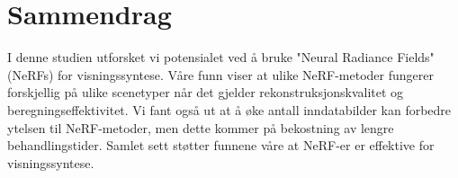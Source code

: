 \chapter*{Sammendrag}

I denne studien utforsket vi potensialet ved å bruke "Neural Radiance Fields" (NeRFs) for visningssyntese. Våre funn viser at ulike NeRF-metoder fungerer forskjellig på ulike scenetyper når det gjelder rekonstruksjonskvalitet og beregningseffektivitet. Vi fant også ut at å øke antall inndatabilder kan forbedre ytelsen til NeRF-metoder, men dette kommer på bekostning av lengre behandlingstider. Samlet sett støtter funnene våre at NeRF-er er effektive for visningssyntese.
